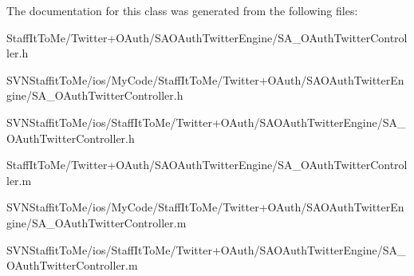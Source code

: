 \-The documentation for this class was generated from the following files\-:\begin{DoxyCompactItemize}
\item 
\-Staff\-It\-To\-Me/\-Twitter+\-O\-Auth/\-S\-A\-O\-Auth\-Twitter\-Engine/\-S\-A\-\_\-\-O\-Auth\-Twitter\-Controller.\-h\item 
\-S\-V\-N\-Staffit\-To\-Me/ios/\-My\-Code/\-Staff\-It\-To\-Me/\-Twitter+\-O\-Auth/\-S\-A\-O\-Auth\-Twitter\-Engine/\-S\-A\-\_\-\-O\-Auth\-Twitter\-Controller.\-h\item 
\-S\-V\-N\-Staffit\-To\-Me/ios/\-Staff\-It\-To\-Me/\-Twitter+\-O\-Auth/\-S\-A\-O\-Auth\-Twitter\-Engine/\-S\-A\-\_\-\-O\-Auth\-Twitter\-Controller.\-h\item 
\-Staff\-It\-To\-Me/\-Twitter+\-O\-Auth/\-S\-A\-O\-Auth\-Twitter\-Engine/\-S\-A\-\_\-\-O\-Auth\-Twitter\-Controller.\-m\item 
\-S\-V\-N\-Staffit\-To\-Me/ios/\-My\-Code/\-Staff\-It\-To\-Me/\-Twitter+\-O\-Auth/\-S\-A\-O\-Auth\-Twitter\-Engine/\-S\-A\-\_\-\-O\-Auth\-Twitter\-Controller.\-m\item 
\-S\-V\-N\-Staffit\-To\-Me/ios/\-Staff\-It\-To\-Me/\-Twitter+\-O\-Auth/\-S\-A\-O\-Auth\-Twitter\-Engine/\-S\-A\-\_\-\-O\-Auth\-Twitter\-Controller.\-m\end{DoxyCompactItemize}
